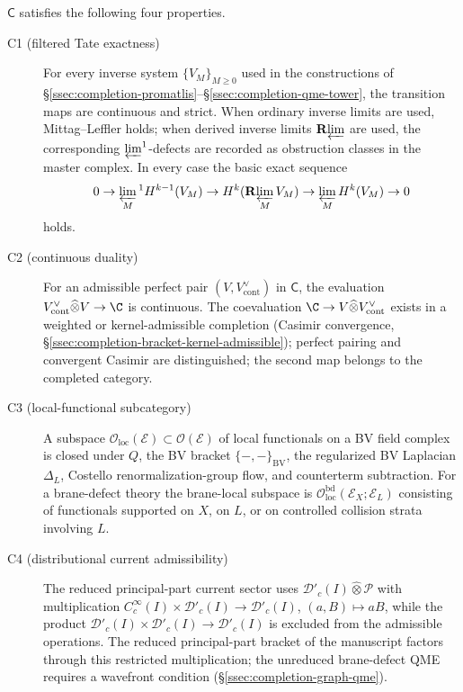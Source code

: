 \begin{lem}
\label{lem:completion-host-axioms}
\(\mathsf C\) satisfies the following four properties.
\begin{description}
\item[\textnormal{C1 (filtered Tate exactness)}] For every inverse
  system \(\{V_M\}_{M\ge 0}\) used in the constructions of
  \S\ref{ssec:completion-promatlis}--\S\ref{ssec:completion-qme-tower},
  the transition maps are continuous and strict.  When ordinary
  inverse limits are used, Mittag--Leffler holds; when derived inverse
  limits \(\mathbf R\!\varprojlim\) are used, the corresponding
  \(\varprojlim^1\)-defects are recorded as obstruction classes in
  the master complex.  In every case the basic exact sequence
  \[
    0\to\varprojlim_M{}^1 H^{k-1}(V_M)\to
    H^k(\mathbf R\!\varprojlim_M V_M)\to
    \varprojlim_M H^k(V_M)\to 0
  \]
  holds.
\item[\textnormal{C2 (continuous duality)}] For an admissible perfect
  pair \((V,V^\vee_{\mathrm{cont}})\) in \(\mathsf C\), the
  evaluation \(V^\vee_{\mathrm{cont}}\widehat\otimes V\to\C\) is
  continuous.  The coevaluation
  \(\C\to V\widehat\otimes V^\vee_{\mathrm{cont}}\) exists in a
  weighted or kernel-admissible completion (Casimir convergence,
  \S\ref{ssec:completion-bracket-kernel-admissible}); perfect
  pairing and convergent Casimir are distinguished; the second
  map belongs to the completed category.
\item[\textnormal{C3 (local-functional subcategory)}]
  A subspace
  \(\mathcal O_{\mathrm{loc}}(\mathcal E)\subset\mathcal O(\mathcal E)\)
  of local functionals on a BV field complex is closed under \(Q\),
  the BV bracket \(\{-,-\}_{\mathrm{BV}}\), the regularized BV
  Laplacian \(\Delta_L\), Costello renormalization-group flow, and
  counterterm subtraction.  For a brane-defect theory the
  brane-local subspace is
  \(\mathcal O^{\mathrm{bd}}_{\mathrm{loc}}(\mathcal E_X;\mathcal E_L)\)
  consisting of functionals supported on \(X\), on \(L\), or on
  controlled collision strata involving \(L\).
\item[\textnormal{C4 (distributional current admissibility)}]
  The reduced principal-part current sector uses
  \(\mathcal D'_c(I)\widehat\otimes\mathcal P\) with multiplication
  \(C^\infty_c(I)\times\mathcal D'_c(I)\to\mathcal D'_c(I)\),
  \((a,B)\mapsto aB\), while the product
  \(\mathcal D'_c(I)\times\mathcal D'_c(I)\to\mathcal D'_c(I)\) is
  excluded from the admissible operations.  The reduced principal-part bracket of the manuscript
  factors through this restricted multiplication; the unreduced
  brane-defect QME requires a wavefront condition
  (\S\ref{ssec:completion-graph-qme}).
\end{description}
\end{lem}

